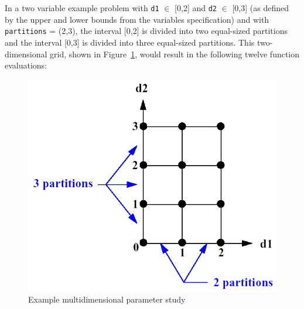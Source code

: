 In a two variable example problem with \texttt{d1} $\in$ [0,2] and 
\texttt{d2} $\in$ [0,3] (as defined by the upper and lower bounds 
from the variables specification) and with \texttt{partitions} =
(2,3), the interval [0,2] is divided into two equal-sized partitions
and the interval [0,3] is divided into three equal-sized partitions. 
This two-dimensional grid, shown in Figure~\ref{ps:figure02}, would 
result in the following twelve function evaluations:
\begin{figure}
  \centering
  \includegraphics[scale=0.5]{images/multi_d_pstudy}
  \caption{Example multidimensional parameter study}
  \label{ps:figure02}
\end{figure}

